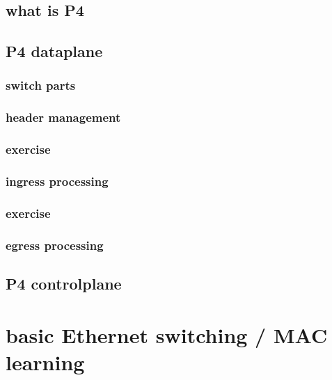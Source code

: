 \subsection{what is P4}

\subsection{P4 dataplane}
\subsubsection{switch parts}

\subsubsection{header management}

\subsubsection{exercise}

\subsubsection{ingress processing}

\subsubsection{exercise}

\subsubsection{egress processing}


\subsection{P4 controlplane}


\section{basic Ethernet switching / MAC learning}







